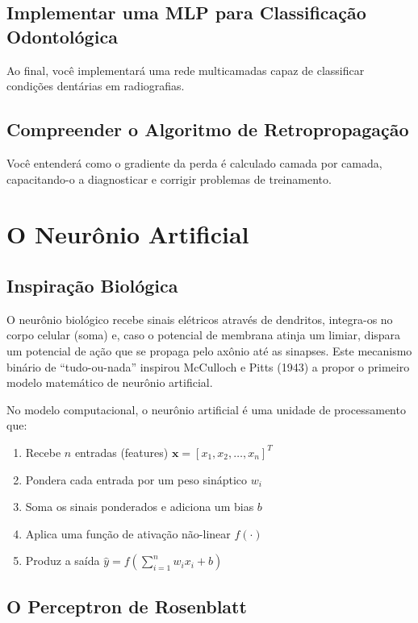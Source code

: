 \subsection{Implementar uma MLP para Classificação Odontológica}
Ao final, você implementará uma rede multicamadas capaz de classificar condições dentárias em radiografias.

\subsection{Compreender o Algoritmo de Retropropagação}
Você entenderá como o gradiente da perda é calculado camada por camada, capacitando-o a diagnosticar e corrigir problemas de treinamento.

\section{O Neurônio Artificial}
\label{sec:neuronio-artificial}

\subsection{Inspiração Biológica}

O neurônio biológico recebe sinais elétricos através de dendritos, integra-os no corpo
celular (soma) e, caso o potencial de membrana atinja um limiar, dispara um potencial
de ação que se propaga pelo axônio até as sinapses. Este mecanismo binário de
``tudo-ou-nada'' inspirou McCulloch e Pitts (1943) a propor o primeiro modelo
matemático de neurônio artificial.

No modelo computacional, o neurônio artificial é uma unidade de processamento que:
\begin{enumerate}
  \item Recebe $n$ entradas (features) $\mathbf{x} = [x_1, x_2, \ldots, x_n]^T$
  \item Pondera cada entrada por um peso sináptico $w_i$
  \item Soma os sinais ponderados e adiciona um bias $b$
  \item Aplica uma função de ativação não-linear $f(\cdot)$
  \item Produz a saída $\hat{y} = f\left(\sum_{i=1}^{n} w_i x_i + b\right)$
\end{enumerate}

\subsection{O Perceptron de Rosenblatt}

